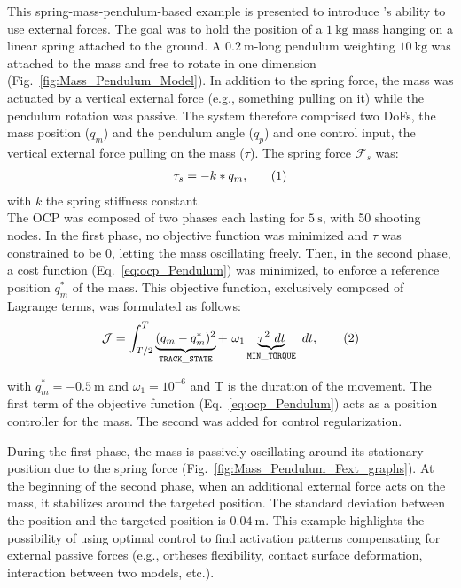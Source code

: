 This spring-mass-pendulum-based example is presented to introduce \bioptim 's ability to use external forces.
The goal was to hold the position of a $\SI{1}{\kilo\gram}$ mass hanging on a linear spring attached to the ground.
A $\SI{0.2}{\meter}$-long pendulum weighting $\SI{10}{\kilo\gram}$ was attached to the mass and free to rotate in one dimension (Fig.~\ref{fig:Mass_Pendulum_Model}).
In addition to the spring force, the mass was actuated by a vertical external force (e.g., something pulling on it) while the pendulum rotation was passive.
The system therefore comprised two DoFs, the mass position ($q_m$) and the pendulum angle ($q_p$) and one control input, the vertical external force pulling on the mass ($\tau$). 
The spring force $\mathcal{F}_s$ was:
\[
\begin{aligned}
\tau_s = -k*q_m,
\end{aligned}
\addtag
\label{eq:f_ext}
\]
with $k$ the spring stiffness constant.\\
The OCP was composed of two phases each lasting for $\SI{5}{\second}$, with 50 shooting nodes.
In the first phase, no objective function was minimized and $\tau$ was constrained to be $0$, letting the mass oscillating freely. 
Then, in the second phase, a cost function (Eq.~\ref{eq:ocp_Pendulum}) was minimized, to enforce a reference position $q_m^*$ of the mass.
This objective function, exclusively composed of Lagrange terms, was formulated as follows:
\[
\mathcal{J} = \int_{T/2}^T \underbrace{ (q_m - q_m^*)^2}_{\mathtt{TRACK\_STATE}}  +~\omega_1 \underbrace{\tau^2~dt}_{\mathtt{MIN\_ TORQUE}}~dt,
\addtag
\label{eq:ocp_Pendulum}
\]

\noindent with $q_m^* = \SI{-0.5}{\meter}$ and $\omega_1 = 10^{-6}$ and T is the duration of the movement.
The first term of the objective function (Eq.~\ref{eq:ocp_Pendulum}) acts as a position controller for the mass.
The second was added for control regularization.


During the first phase, the mass is passively oscillating around its stationary position due to the spring force (Fig.~\ref{fig:Mass_Pendulum_Fext_graphs}).
At the beginning of the second phase, when an additional external force acts on the mass, it stabilizes around the targeted position.
The standard deviation between the position and the targeted position is $\SI{0.04}{\m}$.
This example highlights the possibility of using optimal control to find activation patterns compensating for external passive forces (e.g., ortheses flexibility, contact surface deformation, interaction between two models, etc.).